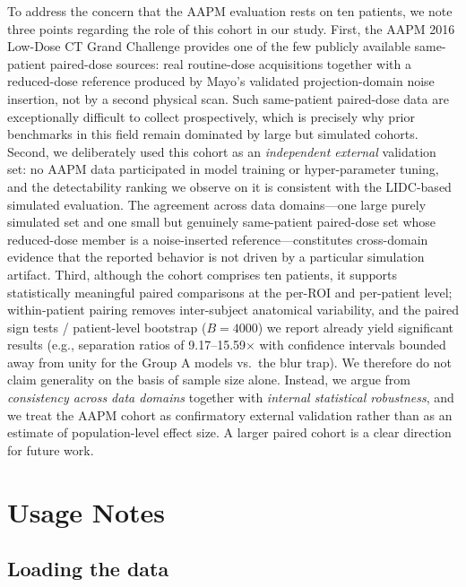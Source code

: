 \documentclass[twoside,11pt]{article}
\begin{document}
To address the concern that the AAPM evaluation rests on ten patients, we note three points regarding the role of this cohort in our study. First, the AAPM 2016 Low-Dose CT Grand Challenge provides one of the few publicly available same-patient paired-dose sources: real routine-dose acquisitions together with a reduced-dose reference produced by Mayo's validated projection-domain noise insertion, not by a second physical scan. Such same-patient paired-dose data are exceptionally difficult to collect prospectively, which is precisely why prior benchmarks in this field remain dominated by large but simulated cohorts. Second, we deliberately used this cohort as an \emph{independent external} validation set: no AAPM data participated in model training or hyper-parameter tuning, and the detectability ranking we observe on it is consistent with the LIDC-based simulated evaluation. The agreement across data domains---one large purely simulated set and one small but genuinely same-patient paired-dose set whose reduced-dose member is a noise-inserted reference---constitutes cross-domain evidence that the reported behavior is not driven by a particular simulation artifact. Third, although the cohort comprises ten patients, it supports statistically meaningful paired comparisons at the per-ROI and per-patient level; within-patient pairing removes inter-subject anatomical variability, and the paired sign tests / patient-level bootstrap ($B = 4000$) we report already yield significant results (e.g., separation ratios of 9.17--15.59$\times$ with confidence intervals bounded away from unity for the Group A models vs.\ the blur trap). We therefore do not claim generality on the basis of sample size alone. Instead, we argue from \emph{consistency across data domains} together with \emph{internal statistical robustness}, and we treat the AAPM cohort as confirmatory external validation rather than as an estimate of population-level effect size. A larger paired cohort is a clear direction for future work.

\section*{Usage Notes}

\subsection*{Loading the data}
\end{document}
